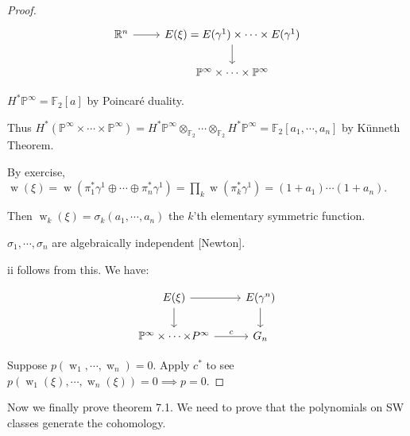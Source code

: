 \documentclass{article}
\theoremstyle{definition}
\begin{document}
    \begin{proof}
        \[
            \begin{tikzcd}
                \mathbb{R}^n \ar[r] & E(\xi) = E(\gamma^1) \times \cdots \times E(\gamma^1) \ar[d] \\ & \mathbb{P}^{\infty} \times \cdots \times \mathbb{P}^{\infty}
            \end{tikzcd}
        \]

        \(H^{\ast} \mathbb{P}^{\infty} = \mathbb{F}_2[a]\) by Poincar\'e duality.

        Thus \(H^{\ast} (\mathbb{P}^{\infty} \times  \cdots \times \mathbb{P}^{\infty}) = H^{\ast} \mathbb{P} ^{\infty} \otimes_{\mathbb{F}_2} \cdots \otimes_{\mathbb{F}_2} H^{\ast} \mathbb{P}^{\infty} = \mathbb{F}_2[a_1, \cdots , a_n]\) by K\"unneth Theorem.

        By exercise, \(\operatorname{w} (\xi) = \operatorname{w} (\pi_1^{\ast} \gamma^1 \oplus \cdots \oplus \pi_n^{\ast} \gamma^1) = \prod_k \operatorname{w} (\pi_k^{\ast} \gamma^1) = (1+a_1) \cdots (1+a_n)\).
        
        Then \(\operatorname{w}_k(\xi) = \sigma_k(a_1, \cdots , a_n)\) the \(k\)'th elementary symmetric function.

        \(\sigma_1, \cdots , \sigma_n\) are algebraically independent [Newton].

        ii follows from this. We have:

        \[
            \begin{tikzcd}
                E(\xi) \ar[r] \ar[d] & E(\gamma^n) \ar[d] \\ \mathbb{P}^{\infty} \times \cdots \mathbb \times {P}^{\infty} \ar[r,"c"] & G_n
            \end{tikzcd}
        \]

        Suppose \(p(\operatorname{w}_1, \cdots , \operatorname{w}_n) = 0\). Apply \(c^{\ast}\) to see \(p(\operatorname{w}_1(\xi), \cdots , \operatorname{w}_n(\xi)) = 0 \implies p = 0\).
    \end{proof}

    Now we finally prove theorem 7.1. We need to prove that the polynomials on SW classes generate the cohomology.
\end{document}
